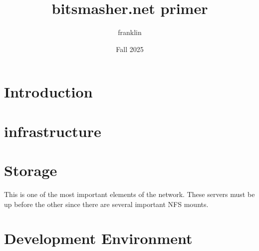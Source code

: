 \documentclass[a4paper,12pt]{book}
\begin{document}
\author{franklin}
\title{bitsmasher.net primer}
\date{Fall 2025}

\frontmatter
\maketitle
\tableofcontents

\mainmatter

\chapter{Introduction}


\chapter{infrastructure}


\chapter{Storage}

This is one of the most important elements of the network. These servers must be up before the other since there are several
important NFS mounts.



\chapter{Development Environment}



\backmatter
\end{document}
